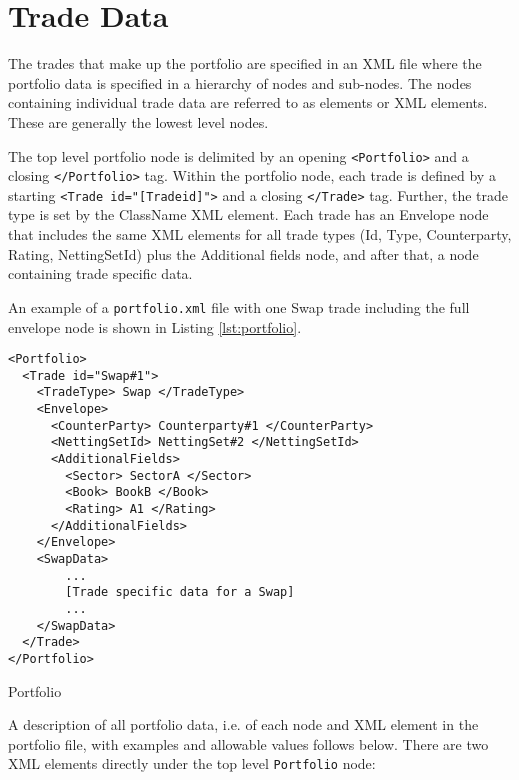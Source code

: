 \section{Trade Data}\label{sec:portfolio_data}

The trades that make up the portfolio are specified in an XML file where the portfolio data is specified in a hierarchy of nodes and sub-nodes.  The nodes containing individual trade data are referred to as elements or XML elements. These are generally the lowest level nodes.

\vspace{1em}

The top level portfolio node is delimited by an opening {\tt <Portfolio>} and a closing {\tt </Portfolio>} tag. Within the portfolio node, each trade is defined by a starting {\tt <Trade id="[Tradeid]">} and a closing {\tt </Trade>} tag.  Further, the trade type is set by the ClassName XML element. Each trade has an Envelope node that includes the same XML elements  for all trade types (Id, Type, Counterparty, Rating, NettingSetId) plus the 
Additional fields node, and after that, a node containing trade specific data.

\vspace{1em}
An example of a {\tt portfolio.xml} file with one Swap trade including the full envelope node is shown in Listing \ref{lst:portfolio}.

\begin{listing}[H]
\begin{verbatim}
<Portfolio>
  <Trade id="Swap#1">
    <TradeType> Swap </TradeType>
    <Envelope>
      <CounterParty> Counterparty#1 </CounterParty>
      <NettingSetId> NettingSet#2 </NettingSetId>
      <AdditionalFields>
        <Sector> SectorA </Sector>
        <Book> BookB </Book>
        <Rating> A1 </Rating>
      </AdditionalFields>
    </Envelope>
    <SwapData>
        ...
        [Trade specific data for a Swap]
        ...
    </SwapData>
  </Trade>
</Portfolio>
\end{verbatim}
\caption{Portfolio}
\label{lst:portfolio}
\end{listing}

A description of all portfolio data, i.e. of each node and XML element in the portfolio file, with examples and allowable values follows below. There are two XML elements directly under the top level {\tt Portfolio} node:

